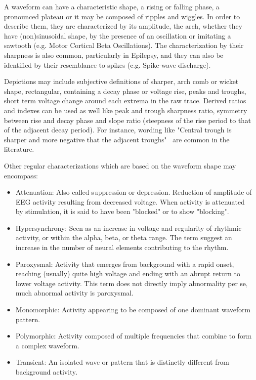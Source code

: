 \documentclass[brainsci,article,submit,moreauthors,pdftex,10pt,a4paper]{mdpi}
\begin{document}
A waveform can have a characteristic shape, a rising or falling phase, a pronounced plateau or it may be composed of ripples and wiggles. In order to describe them, they are characterized by its amplitude, the arch, whether they have (non)sinusoidal shape, by the presence of an oscillation or imitating a sawtooth (e.g. Motor Cortical Beta Oscillations).  The characterization by their sharpness is also common, particularly in Epilepsy, and they can also be identified by their resemblance to spikes (e.g. Spike-wave discharge).

Depictions may include subjective definitions of sharper, arch comb or wicket shape, rectangular, containing a decay phase or voltage rise, peaks and troughs, short term voltage change around each extrema in the raw trace.  Derived ratios and indexes can be used as well like peak and trough sharpness ratio, symmetry between rise and decay phase and slope ratio (steepness of the rise period to that of the adjacent decay period).  For instance,  wording like "Central trough is sharper and more negative that the adjacent troughs"~\citep{Cole2017} are common in the literature.

Other regular characterizations which are based on the waveform shape may encompass:

\begin{itemize}
\item Attenuation: Also called suppression or depression. Reduction of amplitude of EEG activity resulting from decreased voltage. When activity is attenuated by stimulation, it is said to have been "blocked" or to show "blocking".
\item Hypersynchrony: Seen as an increase in voltage and regularity of rhythmic activity, or within the alpha, beta, or theta range. The term suggest an increase in the number of neural elements contributing to the rhythm.
\item Paroxysmal: Activity that emerges from background with a rapid onset, reaching (usually) quite high voltage and ending with an abrupt return to lower voltage activity. This term does not directly imply abnormality per se, much abnormal activity is paroxysmal.
\item Monomorphic: Activity appearing to be composed of one dominant waveform pattern.
\item Polymorphic: Activity composed of multiple frequencies that combine to form a complex waveform.
\item Transient: An isolated wave or pattern that is distinctly different from background activity. 
\end{itemize}
\end{document}
